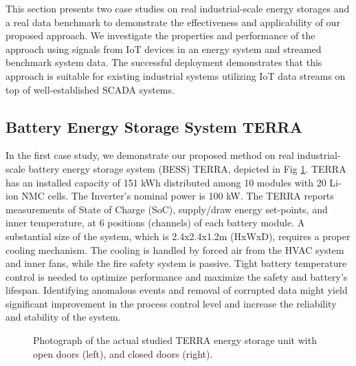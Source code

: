This section presents two case studies on real industrial-scale energy storages and a real data benchmark to demonstrate the effectiveness and applicability of our proposed approach. We investigate the properties and performance of the approach using signals from IoT devices in an energy system and streamed benchmark system data. The successful deployment demonstrates that this approach is suitable for existing industrial systems utilizing IoT data streams on top of well-established SCADA systems.

\subsection{Battery Energy Storage System TERRA}\label{AA:BESS}
In the first case study, we demonstrate our proposed method on real industrial-scale battery energy storage system (BESS) TERRA, depicted in Fig \ref{fig:terra}. TERRA has an installed capacity of 151 kWh distributed among 10 modules with 20 Li-ion NMC cells. The Inverter's nominal power is 100 kW.
The TERRA reports measurements of State of Charge (SoC), supply/draw energy set-points, and inner temperature, at 6 positions (channels) of each battery module. A substantial size of the system, which is 2.4x2.4x1.2m (HxWxD), requires a proper cooling mechanism. The cooling is handled by forced air from the HVAC system and inner fans, while the fire safety system is passive. Tight battery temperature control is needed to optimize performance and maximize the safety and battery's lifespan. Identifying anomalous events and removal of corrupted data might yield significant improvement in the process control level and increase the reliability and stability of the system.

\begin{figure}[htbp]
 \centering
 \caption{Photograph of the actual studied TERRA energy storage unit with open doors (left), and closed doors (right).}
 \label{fig:terra}
\end{figure}

